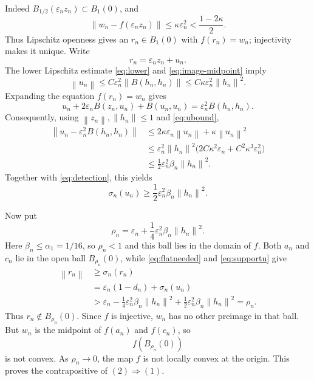 \documentclass[11pt]{article}
\newcommand{\norm}[1]{\left\lVert #1\right\rVert}
\begin{document}
Indeed $B_{1/2}(\varepsilon_nz_n)\subset B_1(0)$, and
\[
 \norm{w_n-f(\varepsilon_nz_n)}
 \leq\kappa\varepsilon_n^2
 <\frac{1-2\kappa}{2}.
\]
Thus Lipschitz openness gives an $r_n\in B_1(0)$ with $f(r_n)=w_n$;
injectivity makes it unique.  Write
\[
                         r_n=\varepsilon_nz_n+u_n.
\]
The lower Lipschitz estimate \eqref{eq:lower} and
\eqref{eq:image-midpoint} imply
\begin{equation}\label{eq:ubound}
 \norm{u_n}
 \leq C\varepsilon_n^2\norm{B(h_n,h_n)}
 \leq C\kappa\varepsilon_n^2\norm{h_n}^2.
\end{equation}
Expanding the equation $f(r_n)=w_n$ gives
\[
 u_n+2\varepsilon_nB(z_n,u_n)+B(u_n,u_n)
       =\varepsilon_n^2B(h_n,h_n).
\]
Consequently, using $\norm{z_n},\norm{h_n}\leq1$ and
\eqref{eq:ubound},
\begin{align*}
 \norm{u_n-\varepsilon_n^2B(h_n,h_n)}
 &\leq2\kappa\varepsilon_n\norm{u_n}
       +\kappa\norm{u_n}^2\\
 &\leq \varepsilon_n^2\norm{h_n}^2
       \bigl(2C\kappa^2\varepsilon_n
              +C^2\kappa^3\varepsilon_n^2\bigr)\\
 &\leq\frac12\varepsilon_n^2\beta_n\norm{h_n}^2.
\end{align*}
Together with \eqref{eq:detection}, this yields
\begin{equation}\label{eq:supportu}
              \sigma_n(u_n)
              \geq\frac12\varepsilon_n^2
                     \beta_n\norm{h_n}^2.
\end{equation}

Now put
\[
\rho_n=\varepsilon_n
       +\frac14\varepsilon_n^2\beta_n\norm{h_n}^2.
\]
Here $\beta_n\leq\alpha_1=1/16$, so $\rho_n<1$ and this ball lies in the
domain of $f$.  Both $a_n$ and $c_n$ lie in the open ball
$B_{\rho_n}(0)$, while
\eqref{eq:flatneeded} and \eqref{eq:supportu} give
\begin{align*}
 \norm{r_n}
 &\geq\sigma_n(r_n)\\
 &=\varepsilon_n(1-d_n)+\sigma_n(u_n)\\
 &>\varepsilon_n
   -\frac14\varepsilon_n^2\beta_n\norm{h_n}^2
   +\frac12\varepsilon_n^2\beta_n\norm{h_n}^2
 =\rho_n.
\end{align*}
Thus $r_n\notin B_{\rho_n}(0)$.  Since $f$ is injective,
$w_n$ has no other preimage in that ball.  But $w_n$ is the midpoint of
$f(a_n)$ and $f(c_n)$, so
\[
                         f(B_{\rho_n}(0))
\]
is not convex.  As $\rho_n\to0$, the map $f$ is not locally convex at the
origin.  This proves the contrapositive of $(2)\Rightarrow(1)$.
\end{document}
